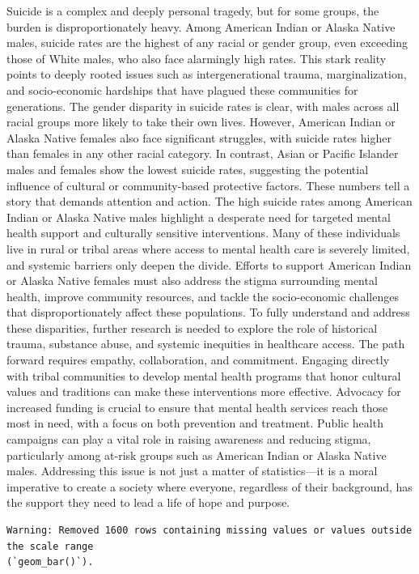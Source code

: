 \documentclass[
  letterpaper,
  DIV=11,
  numbers=noendperiod]{scrartcl}
\begin{document}
Suicide is a complex and deeply personal tragedy, but for some groups,
the burden is disproportionately heavy. Among American Indian or Alaska
Native males, suicide rates are the highest of any racial or gender
group, even exceeding those of White males, who also face alarmingly
high rates. This stark reality points to deeply rooted issues such as
intergenerational trauma, marginalization, and socio-economic hardships
that have plagued these communities for generations. The gender
disparity in suicide rates is clear, with males across all racial groups
more likely to take their own lives. However, American Indian or Alaska
Native females also face significant struggles, with suicide rates
higher than females in any other racial category. In contrast, Asian or
Pacific Islander males and females show the lowest suicide rates,
suggesting the potential influence of cultural or community-based
protective factors. These numbers tell a story that demands attention
and action. The high suicide rates among American Indian or Alaska
Native males highlight a desperate need for targeted mental health
support and culturally sensitive interventions. Many of these
individuals live in rural or tribal areas where access to mental health
care is severely limited, and systemic barriers only deepen the divide.
Efforts to support American Indian or Alaska Native females must also
address the stigma surrounding mental health, improve community
resources, and tackle the socio-economic challenges that
disproportionately affect these populations. To fully understand and
address these disparities, further research is needed to explore the
role of historical trauma, substance abuse, and systemic inequities in
healthcare access. The path forward requires empathy, collaboration, and
commitment. Engaging directly with tribal communities to develop mental
health programs that honor cultural values and traditions can make these
interventions more effective. Advocacy for increased funding is crucial
to ensure that mental health services reach those most in need, with a
focus on both prevention and treatment. Public health campaigns can play
a vital role in raising awareness and reducing stigma, particularly
among at-risk groups such as American Indian or Alaska Native males.
Addressing this issue is not just a matter of statistics---it is a moral
imperative to create a society where everyone, regardless of their
background, has the support they need to lead a life of hope and
purpose.

\begin{verbatim}
Warning: Removed 1600 rows containing missing values or values outside the scale range
(`geom_bar()`).
\end{verbatim}
\end{document}
